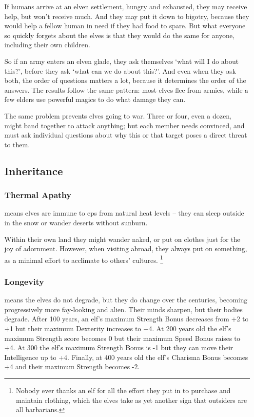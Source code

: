 \begin{multicols}{2}
If humans arrive at an elven settlement, hungry and exhausted, they may receive help, but won't receive much.
And they may put it down to bigotry, because they would help a fellow human in need if they had food to spare.
But what everyone so quickly forgets about the elves is that they would do the same for anyone, including their own children.

So if an army enters an elven glade, they ask themselves `what will I do about this?', before they ask `what can we do about this?'.
And even when they ask both, the order of questions matters a lot, because it determines the order of the answers.
The results follow the same pattern: most elves flee from armies, while a few elders use powerful magics to do what damage they can.

The same problem prevents elves going to war.
Three or four, even a dozen, might band together to attack anything; but each member needs convinced, and must ask individual questions about why this or that target poses a direct threat to them.

\subsection{Inheritance}

\subsubsection[Thermal Apathy: take no penalties from natural weather.]{Thermal Apathy}
\label{elvenInheritance}
means elves are immune to \glspl{ep} from natural heat levels -- they can sleep outside in the snow or wander deserts without sunburn.

Within their own land they might wander naked, or put on clothes just for the joy of adornment.
However, when visiting abroad, they always put on something, as a minimal effort to acclimate to others' cultures.%
\footnote{Nobody ever thanks an elf for all the effort they put in to purchase and maintain clothing, which the elves take as yet another sign that outsiders are all barbarians.}

\subsubsection{Longevity}
means the elves do not degrade, but they do change over the centuries, becoming progressively more fay-looking and alien.
Their minds sharpen, but their bodies degrade.
After 100 years, an elf's maximum Strength Bonus decreases from +2 to +1 but their maximum Dexterity increases to +4.
At 200 years old the elf's maximum Strength score becomes 0 but their maximum Speed Bonus raises to +4.
At 300 the elf's maximum Strength Bonus is -1 but they can move their Intelligence up to +4.
Finally, at 400 years old the elf's Charisma Bonus becomes +4 and their maximum Strength becomes -2.


\end{multicols}
